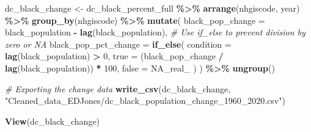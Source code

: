 \documentclass[
]{article}
\newenvironment{Shaded}{\begin{snugshade}}{\end{snugshade}}
\newcommand{\AttributeTok}[1]{\textcolor[rgb]{0.13,0.29,0.53}{#1}}
\newcommand{\CommentTok}[1]{\textcolor[rgb]{0.56,0.35,0.01}{\textit{#1}}}
\newcommand{\ConstantTok}[1]{\textcolor[rgb]{0.56,0.35,0.01}{#1}}
\newcommand{\DecValTok}[1]{\textcolor[rgb]{0.00,0.00,0.81}{#1}}
\newcommand{\FunctionTok}[1]{\textcolor[rgb]{0.13,0.29,0.53}{\textbf{#1}}}
\newcommand{\NormalTok}[1]{#1}
\newcommand{\OtherTok}[1]{\textcolor[rgb]{0.56,0.35,0.01}{#1}}
\newcommand{\SpecialCharTok}[1]{\textcolor[rgb]{0.81,0.36,0.00}{\textbf{#1}}}
\newcommand{\StringTok}[1]{\textcolor[rgb]{0.31,0.60,0.02}{#1}}
\begin{document}
\begin{Shaded}
\begin{Highlighting}[]
\NormalTok{dc\_black\_change }\OtherTok{\textless{}{-}}\NormalTok{ dc\_black\_percent\_full }\SpecialCharTok{\%\textgreater{}\%}
  \FunctionTok{arrange}\NormalTok{(nhgiscode, year) }\SpecialCharTok{\%\textgreater{}\%}
  \FunctionTok{group\_by}\NormalTok{(nhgiscode) }\SpecialCharTok{\%\textgreater{}\%}
  \FunctionTok{mutate}\NormalTok{(}
    \AttributeTok{black\_pop\_change =}\NormalTok{ black\_population }\SpecialCharTok{{-}} \FunctionTok{lag}\NormalTok{(black\_population),}
    \CommentTok{\# Use if\_else to prevent division by zero or NA}
    \AttributeTok{black\_pop\_pct\_change =} \FunctionTok{if\_else}\NormalTok{(}
      \AttributeTok{condition =} \FunctionTok{lag}\NormalTok{(black\_population) }\SpecialCharTok{\textgreater{}} \DecValTok{0}\NormalTok{, }
      \AttributeTok{true =}\NormalTok{ (black\_pop\_change }\SpecialCharTok{/} \FunctionTok{lag}\NormalTok{(black\_population)) }\SpecialCharTok{*} \DecValTok{100}\NormalTok{, }
      \AttributeTok{false =} \ConstantTok{NA\_real\_}
\NormalTok{    )}
\NormalTok{  ) }\SpecialCharTok{\%\textgreater{}\%}
  \FunctionTok{ungroup}\NormalTok{()}

\CommentTok{\# Exporting the change data}
\FunctionTok{write\_csv}\NormalTok{(dc\_black\_change, }\StringTok{"Cleaned\_data\_EDJones/dc\_black\_population\_change\_1960\_2020.csv"}\NormalTok{)}

\FunctionTok{View}\NormalTok{(dc\_black\_change)}
\end{Highlighting}
\end{Shaded}
\end{document}

